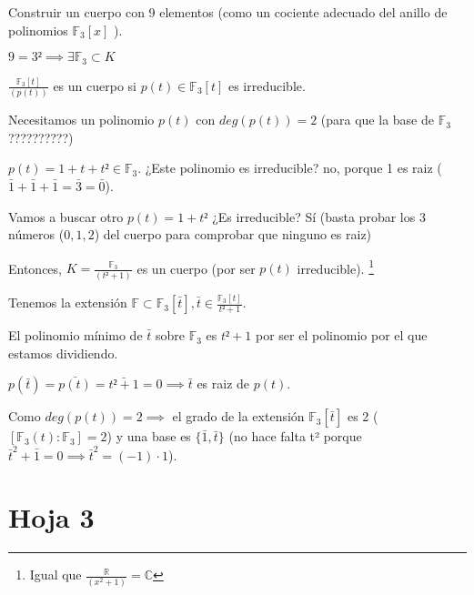 \begin{problem}[6]
 \label{H1.E6}
 Construir un cuerpo con 9 elementos (como un cociente adecuado del anillo de polinomios $\mathbb{F}_3 [x]$ ).

\solution

$9=3² \implies ∃ \mathbb{F}_3 \subset K$

$\displaystyle \frac{\mathbb{F}_3[t]}{(p(t))}$ es un cuerpo si $p(t) \in \mathbb{F}_3[t]$ es irreducible.


Necesitamos un polinomio $p(t)$ con $deg(p(t)) = 2$ (para que la base de $\mathbb{F}_3$ ??????????)

$p(t) = 1+t+t² ∈ \mathbb{F}_3$. ¿Este polinomio es irreducible? no, porque 1 es raiz ($\bar{1}+\bar{1}+\bar{1}=\bar{3} = \bar{0}$).

Vamos a buscar otro $p(t) = 1+t²$ ¿Es irreducible? Sí (basta probar los 3 números ($0,1,2$) del cuerpo para comprobar que ninguno es raiz)

Entonces, $K = \frac{\mathbb{F}_3}{(t²+1)}$ es un cuerpo (por ser $p(t)$ irreducible). \footnote{Igual que $\displaystyle\frac{ℝ}{(x^2+1)} = ℂ$}

Tenemos la extensión $\mathbb{F} \subset \mathbb{F}_3[\bar{t}], \bar{t}∈ \frac{\mathbb{F}_3[t]}{t²+1}$. 

El polinomio mínimo de $\bar{t}$ sobre $\mathbb{F}_3$ es $t²+1$ por ser el polinomio por el que estamos dividiendo.


$p(\bar{t}) = \bar{p(t)} = \bar{t²+1} = 0 \implies \bar{t}$ es raiz de $p(t)$.

Como $deg(p(t)) = 2 \implies $ el grado de la extensión $\mathbb{F}_3[\bar{t}]$ es 2 ($[\mathbb{F}_3(t):\mathbb{F}_3]=2$) y una base es $\{\bar{1},\bar{t}\}$ (no hace falta t² porque $\bar{t}^2 + \bar{1} = 0 \implies \bar{t}^2 = (-1)·1$).
\end{problem}

\section{Hoja 3}

